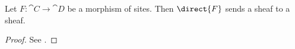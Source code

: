 \begin{lemma}
Let $F: \cat{C} \rightarrow \cat{D}$ be a morphism of sites.
Then $\direct{F}$ sends a sheaf to a sheaf.
\end{lemma}
\begin{proof}
See \cite[C2.3]{elephant}.
\end{proof}